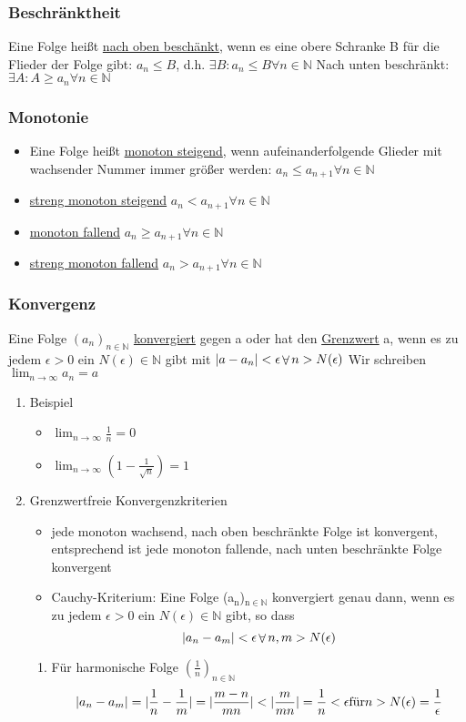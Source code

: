 \documentclass[11pt]{article}
\DeclarePairedDelimiter\abs{\lvert}{\rvert}%
\DeclareMathOperator{\Forall}{\forall}
\begin{document}
\subsubsection{Beschränktheit}
\label{sec-3-1-4}
Eine Folge heißt \uline{nach oben beschänkt}, wenn es eine obere Schranke B für die Flieder der Folge gibt: $a_n \leq B$, d.h. $\exists B: a_n \leq B \Forall n \in \mathbb{N}$
Nach unten beschränkt: $\exists A: A \geq a_n \Forall n\in\mathbb{N}$
\subsubsection{Monotonie}
\label{sec-3-1-5}
\begin{itemize}
\item Eine Folge heißt \uline{monoton steigend}, wenn aufeinanderfolgende Glieder mit wachsender Nummer immer größer werden: $a_n \leq a_{n+1} \Forall n\in\mathbb{N}$
\item \uline{streng monoton steigend} $a_n < a_{n+1} \Forall n\in\mathbb{N}$
\item \uline{monoton fallend} $a_n \geq a_{n+1} \Forall n\in\mathbb{N}$
\item \uline{streng monoton fallend} $a_n > a_{n+1} \Forall n\in\mathbb{N}$
\end{itemize}
\subsubsection{Konvergenz}
\label{sec-3-1-6}
Eine Folge $(a_n)_{n\in\mathbb{N}}$ \uline{konvergiert} gegen a oder hat den \uline{Grenzwert} a, wenn es zu jedem $\epsilon > 0$ ein $N(\epsilon)\in\mathbb{N}$ gibt mit $\abs{a-a_n} < \epsilon \Forall n > N(\epsilon)$
Wir schreiben $\lim_{n\to\infty}a_n = a$
\begin{enumerate}
\item Beispiel
\label{sec-3-1-6-1}
\begin{itemize}
\item $\lim_{n\to\infty}\frac{1}{n} = 0$
\item $\lim_{n\to\infty}(1-\frac{1}{\sqrt{n}}) = 1$
\end{itemize}
\item Grenzwertfreie Konvergenzkriterien
\label{sec-3-1-6-2}
\begin{itemize}
\item jede monoton wachsend, nach oben beschränkte Folge ist konvergent, entsprechend ist jede monoton fallende, nach unten beschränkte Folge konvergent
\item Cauchy-Kriterium: Eine Folge (a$_{\text{n}}$)$_{\text{n}\in\mathbb{N}}$ konvergiert genau dann, wenn es zu jedem $\epsilon > 0$ ein  $N(\epsilon)\in\mathbb{N}$ gibt, so dass \[\abs{a_n - a_m} < \epsilon\Forall n,m > N(\epsilon)\]
\end{itemize}
\begin{enumerate}
\item Für harmonische Folge $(\frac{1}{n})_{n\in\mathbb{N}}$
\label{sec-3-1-6-2-1}
\[\abs{a_n - a_m} = \abs{\frac{1}{n} - \frac{1}{m}} = \abs{\frac{m-n}{m n}} < \abs{\frac{m}{m n}} = \frac{1}{n} < \epsilon \text{für} n > N(\epsilon) = \frac{1}{\epsilon}\]
\end{enumerate}
\end{enumerate}
\end{document}
